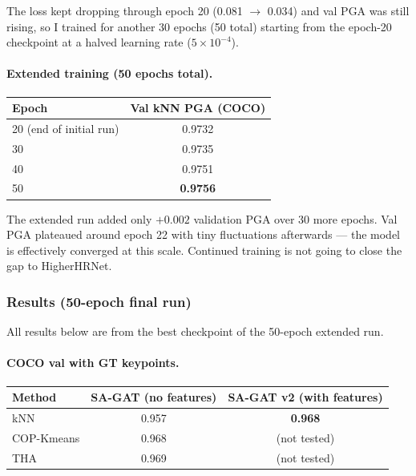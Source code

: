 The loss kept dropping through epoch 20 (0.081 $\to$ 0.034) and val PGA was still rising, so I trained for another 30 epochs (50 total) starting from the epoch-20 checkpoint at a halved learning rate ($5 \times 10^{-4}$).

\paragraph{Extended training (50 epochs total).}

\begin{center}
\begin{tabular}{lc}
\hline
\textbf{Epoch} & \textbf{Val kNN PGA (COCO)} \\
\hline
20 (end of initial run) & 0.9732 \\
30 & 0.9735 \\
40 & 0.9751 \\
50 & \textbf{0.9756} \\
\hline
\end{tabular}
\end{center}

The extended run added only $+0.002$ validation PGA over 30 more epochs. Val PGA plateaued around epoch 22 with tiny fluctuations afterwards --- the model is effectively converged at this scale. Continued training is not going to close the gap to HigherHRNet.

\subsubsection{Results (50-epoch final run)}

All results below are from the best checkpoint of the 50-epoch extended run.

\paragraph{COCO val with GT keypoints.}

\begin{tabular}{lcc}
\hline
\textbf{Method} & \textbf{SA-GAT (no features)} & \textbf{SA-GAT v2 (with features)} \\
\hline
kNN & 0.957 & \textbf{0.968} \\
COP-Kmeans & 0.968 & (not tested) \\
THA & 0.969 & (not tested) \\
\hline
\end{tabular}

\vspace{0.5em}

